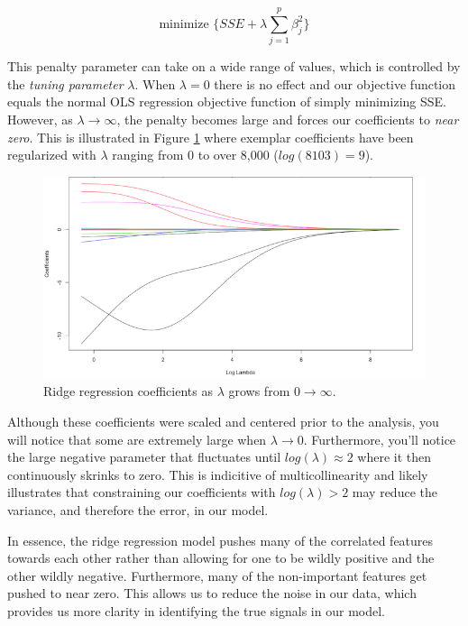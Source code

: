 \documentclass[]{book}
\theoremstyle{definition}
\theoremstyle{definition}
\theoremstyle{definition}
\theoremstyle{remark}
\begin{document}
\begin{equation}
\label{eq:ridge-penalty}
\text{minimize } \bigg \{ SSE + \lambda \sum^p_{j=1} \beta_j^2 \bigg \}
\end{equation}

This penalty parameter can take on a wide range of values, which is
controlled by the \emph{tuning parameter} \(\lambda\). When
\(\lambda = 0\) there is no effect and our objective function equals the
normal OLS regression objective function of simply minimizing SSE.
However, as \(\lambda \rightarrow \infty\), the penalty becomes large
and forces our coefficients to \emph{near zero}. This is illustrated in
Figure \ref{fig:ridge-coef-example} where exemplar coefficients have
been regularized with \(\lambda\) ranging from 0 to over 8,000
(\(log(8103) = 9\)).

\begin{figure}

{\centering \includegraphics[width=0.75\linewidth,height=0.75\textheight]{illustrations/ridge_coef} 

}

\caption{Ridge regression coefficients as $\lambda$ grows from  $0 \rightarrow \infty$.}\label{fig:ridge-coef-example}
\end{figure}

Although these coefficients were scaled and centered prior to the
analysis, you will notice that some are extremely large when
\(\lambda \rightarrow 0\). Furthermore, you'll notice the large negative
parameter that fluctuates until \(log(\lambda) \approx 2\) where it then
continuously skrinks to zero. This is indicitive of multicollinearity
and likely illustrates that constraining our coefficients with
\(log(\lambda) > 2\) may reduce the variance, and therefore the error,
in our model.

In essence, the ridge regression model pushes many of the correlated
features towards each other rather than allowing for one to be wildly
positive and the other wildly negative. Furthermore, many of the
non-important features get pushed to near zero. This allows us to reduce
the noise in our data, which provides us more clarity in identifying the
true signals in our model.
\end{document}
